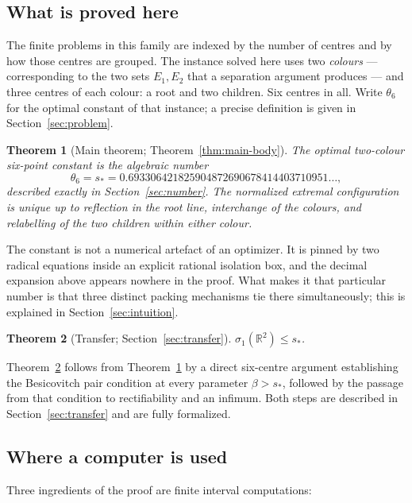 \documentclass[11pt]{article}
\theoremstyle{plain}
\newtheorem{theorem}{Theorem}[section]
\theoremstyle{definition}
\theoremstyle{remark}
\newcommand{\R}{\mathbb R}
\newcommand{\sstar}{s_{\!*}}
\begin{document}
\subsection{What is proved here}

The finite problems in this family are indexed by the number of centres and
by how those centres are grouped.  The instance solved here uses two
\emph{colours} --- corresponding to the two sets $E_1,E_2$ that a
separation argument produces --- and three centres of each colour: a root
and two children.  Six centres in all.  Write $\theta_6$ for the optimal
constant of that instance; a precise definition is given in
Section~\ref{sec:problem}.

\begin{theorem}[Main theorem; Theorem~\ref{thm:main-body}]\label{thm:A}
The optimal two-colour six-point constant is the algebraic number
\[
 \theta_6=\sstar=0.693306421825904872690678414403710951\ldots,
\]
described exactly in Section~\ref{sec:number}.  The normalized extremal
configuration is unique up to reflection in the root line, interchange of
the colours, and relabelling of the two children within either colour.
\end{theorem}

The constant is not a numerical artefact of an optimizer.  It is pinned by
two radical equations inside an explicit rational isolation box, and the
decimal expansion above appears nowhere in the proof.  What makes it that
particular number is that three distinct packing mechanisms tie there
simultaneously; this is explained in Section~\ref{sec:intuition}.

\begin{theorem}[Transfer; Section~\ref{sec:transfer}]\label{thm:B}
$\sigma_1(\R^2)\le\sstar$.
\end{theorem}

Theorem~\ref{thm:B} follows from Theorem~\ref{thm:A} by a direct six-centre
argument establishing the Besicovitch pair condition at every parameter
$\beta>\sstar$, followed by the passage from that condition to
rectifiability and an infimum.  Both steps are described in
Section~\ref{sec:transfer} and are fully formalized.

\subsection{Where a computer is used}

Three ingredients of the proof are finite interval computations:
\end{document}
